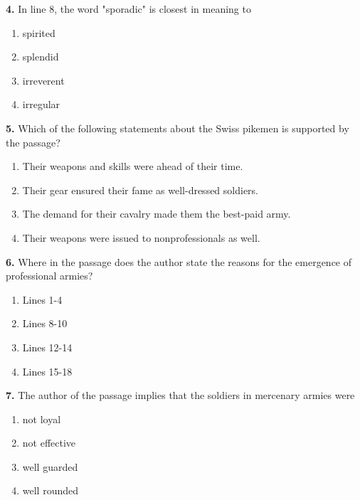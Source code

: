 \documentclass[12pt]{article}
\begin{document}
\par
\vspace{0.25\baselineskip}
\noindent\textbf{4.} In line 8, the word "sporadic" is closest in meaning to
\begin{enumerate}[label=(\Alph*),leftmargin=*,itemsep=0.2em]
\item spirited
\item splendid
\item irreverent
\item irregular
\end{enumerate}
\par
\vspace{0.25\baselineskip}
\noindent\textbf{5.} Which of the following statements about the Swiss pikemen is supported by the passage?
\begin{enumerate}[label=(\Alph*),leftmargin=*,itemsep=0.2em]
\item Their weapons and skills were ahead of their time.
\item Their gear ensured their fame as well-dressed soldiers.
\item The demand for their cavalry made them the best-paid army.
\item Their weapons were issued to nonprofessionals as well.
\end{enumerate}
\par
\vspace{0.25\baselineskip}
\noindent\textbf{6.} Where in the passage does the author state the reasons for the emergence of professional armies?
\begin{enumerate}[label=(\Alph*),leftmargin=*,itemsep=0.2em]
\item Lines 1-4
\item Lines 8-10
\item Lines 12-14
\item Lines 15-18
\end{enumerate}
\par
\vspace{0.25\baselineskip}
\noindent\textbf{7.} The author of the passage implies that the soldiers in mercenary armies were
\begin{enumerate}[label=(\Alph*),leftmargin=*,itemsep=0.2em]
\item not loyal
\item not effective
\item well guarded
\item well rounded
\end{enumerate}
\par
\end{document}
